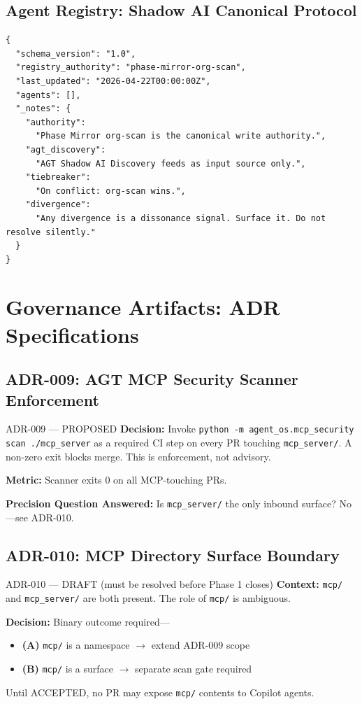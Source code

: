 \documentclass[12pt,a4paper]{article}
\theoremstyle{definition}
\theoremstyle{remark}
\begin{document}
\subsection{Agent Registry: Shadow AI Canonical Protocol}

\begin{lstlisting}[caption={state/agent-registry.json scaffold}]
{
  "schema_version": "1.0",
  "registry_authority": "phase-mirror-org-scan",
  "last_updated": "2026-04-22T00:00:00Z",
  "agents": [],
  "_notes": {
    "authority":
      "Phase Mirror org-scan is the canonical write authority.",
    "agt_discovery":
      "AGT Shadow AI Discovery feeds as input source only.",
    "tiebreaker":
      "On conflict: org-scan wins.",
    "divergence":
      "Any divergence is a dissonance signal. Surface it. Do not resolve silently."
  }
}
\end{lstlisting}


\section{Governance Artifacts: ADR Specifications}

\subsection{ADR-009: AGT MCP Security Scanner Enforcement}

\begin{adrbox}{ADR-009 — PROPOSED}
\textbf{Decision:} Invoke \texttt{python -m agent\_os.mcp\_security scan ./mcp\_server}
as a required CI step on every PR touching \texttt{mcp\_server/}. A non-zero exit
blocks merge. This is enforcement, not advisory.

\textbf{Metric:} Scanner exits 0 on all MCP-touching PRs.

\textbf{Precision Question Answered:} Is \texttt{mcp\_server/} the only inbound
surface? No---see ADR-010.
\end{adrbox}

\subsection{ADR-010: MCP Directory Surface Boundary}

\begin{adrbox}{ADR-010 — DRAFT (must be resolved before Phase 1 closes)}
\textbf{Context:} \texttt{mcp/} and \texttt{mcp\_server/} are both present.
The role of \texttt{mcp/} is ambiguous.

\textbf{Decision:} Binary outcome required---
\begin{itemize}[noitemsep]
  \item \textbf{(A)} \texttt{mcp/} is a namespace $\to$ extend ADR-009 scope
  \item \textbf{(B)} \texttt{mcp/} is a surface $\to$ separate scan gate required
\end{itemize}

Until ACCEPTED, no PR may expose \texttt{mcp/} contents to Copilot agents.
\end{adrbox}
\end{document}

